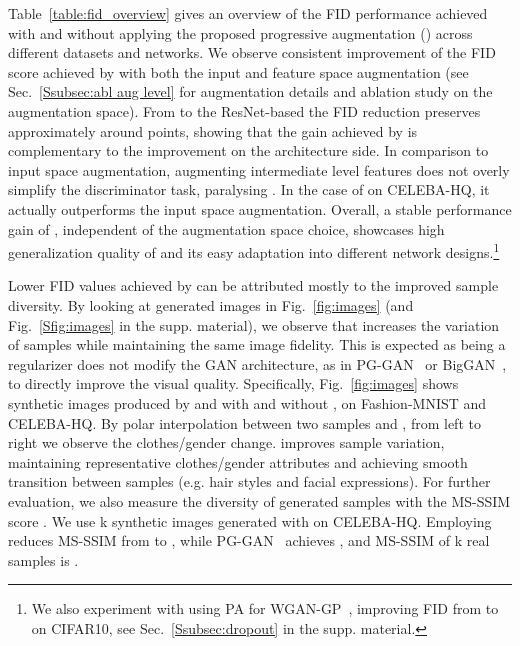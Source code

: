 \documentclass{article}
\begin{document}
Table~\ref{table:fid_overview} gives an overview of the FID performance achieved with and without applying the proposed progressive augmentation () across different datasets and networks. We observe consistent improvement of the FID score achieved by  with both the input  and feature  space augmentation (see Sec.~\ref{Ssubsec:abl aug level} for augmentation details and ablation study on the augmentation space). From  to the ResNet-based  the FID reduction preserves approximately around  points, showing that the gain achieved by  is complementary to the improvement on the architecture side. In comparison to input space augmentation, augmenting intermediate level features does not overly simplify the discriminator task, paralysing . In the case of  on CELEBA-HQ, it actually outperforms the input space augmentation. Overall, a stable performance gain of , independent of the augmentation space choice, showcases high generalization quality of  and its easy adaptation into different network designs.\footnote{We also experiment with using PA for WGAN-GP~\cite{Arjovsky2017WGAN}, improving FID from  to  on CIFAR10, see Sec.~\ref{Ssubsec:dropout} in the supp. material.} 

Lower FID values achieved by  can be attributed mostly to the improved sample diversity. By looking at generated images in Fig.~\ref{fig:images} (and Fig.~\ref{Sfig:images} in the supp. material), we observe that  increases the variation of samples while maintaining the same image fidelity. This is expected as  being a regularizer does not modify the GAN architecture, as in PG-GAN~\cite{karras2018progressive} or BigGAN~\cite{Brock2019}, to directly improve the visual quality. Specifically, Fig.~\ref{fig:images} shows synthetic images produced by  and  with and without , on Fashion-MNIST and CELEBA-HQ. By polar interpolation between two samples  and , from left to right we observe the clothes/gender change.  improves sample variation, maintaining representative clothes/gender attributes and achieving smooth transition between samples (e.g. hair styles and facial expressions). For further evaluation, we also measure the diversity of generated samples with the MS-SSIM score \cite{odena17a}. We use \unit{k} synthetic images generated with  on CELEBA-HQ. Employing  reduces MS-SSIM from  to , while  PG-GAN~\cite{karras2018progressive} achieves , and MS-SSIM of \unit{k} real samples is . 
\end{document}
